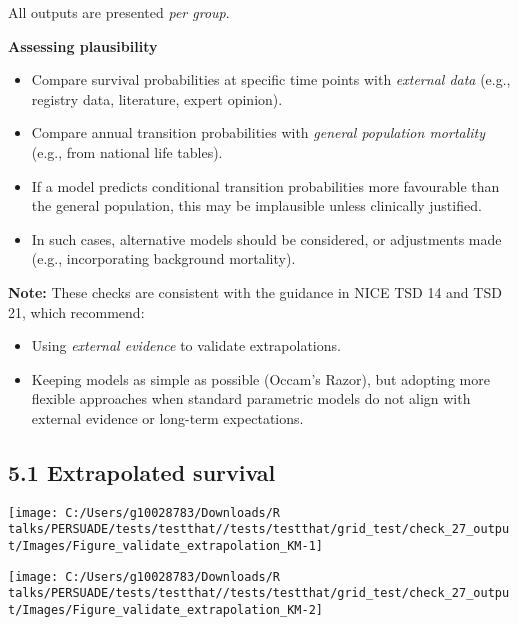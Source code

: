 \documentclass[
]{article}
\providecommand{\tightlist}{%
  \setlength{\itemsep}{0pt}\setlength{\parskip}{0pt}}
\begin{document}
All outputs are presented \emph{per group}.

\textbf{Assessing plausibility}

\begin{itemize}
\tightlist
\item
  Compare survival probabilities at specific time points with
  \emph{external data} (e.g., registry data, literature, expert
  opinion).\\
\item
  Compare annual transition probabilities with \emph{general population
  mortality} (e.g., from national life tables).\\
\item
  If a model predicts conditional transition probabilities more
  favourable than the general population, this may be implausible unless
  clinically justified.\\
\item
  In such cases, alternative models should be considered, or adjustments
  made (e.g., incorporating background mortality).
\end{itemize}

\textbf{Note:} These checks are consistent with the guidance in NICE TSD
14 and TSD 21, which recommend:

\begin{itemize}
\tightlist
\item
  Using \emph{external evidence} to validate extrapolations.\\
\item
  Keeping models as simple as possible (Occam's Razor), but adopting
  more flexible approaches when standard parametric models do not align
  with external evidence or long-term expectations.
\end{itemize}

\subsection{5.1 Extrapolated survival}\label{extrapolated-survival}

\begin{flushleft}\texttt{[image: C:/Users/g10028783/Downloads/R talks/PERSUADE/tests/testthat//tests/testthat/grid\_test/check\_27\_output/Images/Figure\_validate\_extrapolation\_KM-1]} \end{flushleft}

\begin{flushleft}\texttt{[image: C:/Users/g10028783/Downloads/R talks/PERSUADE/tests/testthat//tests/testthat/grid\_test/check\_27\_output/Images/Figure\_validate\_extrapolation\_KM-2]} \end{flushleft}
\end{document}
